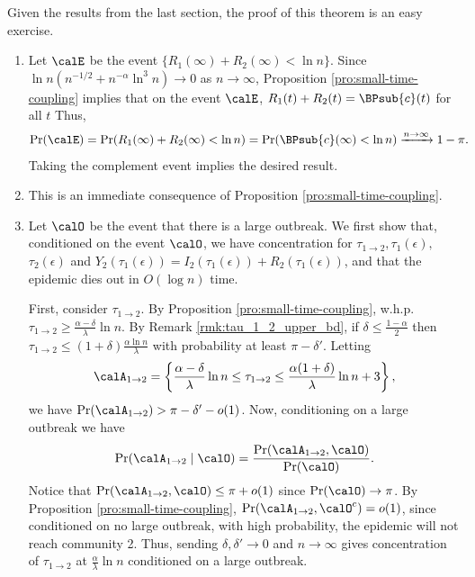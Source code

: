 \documentclass[11pt]{article}
\begin{document}
\noindent Given the results from the last section, the proof of this theorem is an easy exercise. 
\begin{enumerate}[label=(\alph*)]
    \item Let $\calE$ be the event $\{R_1(\infty) + R_2(\infty) < \ln n\}$. 
   Since $\ln n(n^{-1/2}+n^{-\alpha}\ln^3 n)\to 0$ as $n\to\infty$, Proposition \ref{pro:small-time-coupling} implies that
    on the event $\calE$,  $R_1(t) + R_2(t) = \BPsub{c}(t)$ for all $t$ Thus,
    \begin{align*}
        \Pr(\calE) = \Pr(R_1(\infty) + R_2(\infty) < \ln n) &= \Pr(\BPsub{c}(\infty) < \ln n) \xrightarrow{n\to\infty} 1-\pi.
    \end{align*}
    Taking the complement event implies the desired result.
    \item This is an immediate consequence of Proposition \ref{pro:small-time-coupling}. 
    \item 
    Let $\calO$ be the event that there is a large outbreak. 
    We first show that, conditioned on the event $\calO$, we have concentration for $\tau_{1\to 2}, \tau_1(\epsilon),$  $\tau_2(\epsilon)$ and $Y_2(\tau_1(\epsilon))=I_2(\tau_1(\epsilon)) + R_2(\tau_1(\epsilon))$, and that the epidemic dies out in $O(\log n)$ time. 
    
    First, consider $\tau_{1\to 2}$. By Proposition \ref{pro:small-time-coupling}, w.h.p. $\tau_{1\to 2} \geq \frac{\alpha-\delta}{\lambda}\ln n$. By Remark \ref{rmk:tau_1_2_upper_bd}, if 
    $\delta \leq \frac{1-\alpha}2$ then
    $\tau_{1\to 2} \leq (1+\delta)\frac{\alpha\ln n}\lambda$ with probability 
    at least $\pi - \delta'$. Letting 
    \[
        \calA_{1\to 2} =\left\{\frac{\alpha - \delta}{\lambda}\ln n \leq \tau_{1\to 2} \leq \frac{\alpha(1+\delta)}{\lambda}\ln n +3\right\},
    \]
    we have $\Pr(\calA_{1\to 2}) > \pi - \delta' - o(1)$. Now, conditioning on a large outbreak we have
    \[
        \Pr(\calA_{1\to 2} \mid \calO) = \frac{\Pr(\calA_{1\to 2}, \calO)}{\Pr(\calO)}.
    \]
    Notice that $\Pr(\calA_{1\to 2}, \calO) \leq \pi + o(1)$ since $\Pr(\calO) \to \pi$. By Proposition \ref{pro:small-time-coupling}, $\Pr(\calA_{1\to 2}, \calO^c) = o(1)$, since conditioned on no large outbreak, with high probability, the epidemic will not reach community 2. Thus, sending $\delta,\delta'\to 0$ and $n\to\infty$ gives concentration of $\tau_{1\to 2}$ at $\frac{\alpha}{\lambda}\ln n$ conditioned on a large outbreak.


\end{enumerate}
\end{document}
